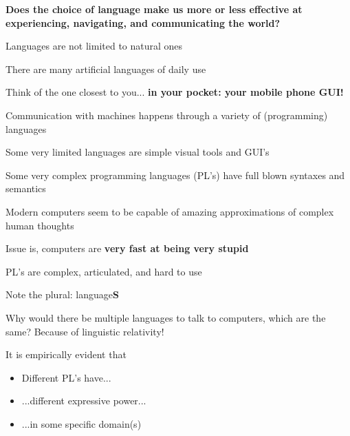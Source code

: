 \documentclass{beamer}
\begin{document}
\begin{slide}{
\item \textbf{Does the choice of language make us more or less effective at experiencing, navigating, and communicating the world?}
}\end{slide}

\begin{slide}{
\item Languages are not limited to natural ones
\item There are many artificial languages of daily use
\item Think of the one closest to you... \pause \textbf{in your pocket: your mobile phone GUI!}
}\end{slide}

\begin{slide}{
\item Communication with machines happens through a variety of (programming) languages
\item Some very limited languages are simple visual tools and GUI's
\item Some very complex programming languages (PL's) have full blown syntaxes and semantics
}\end{slide}

\begin{slide}{
\item Modern computers seem to be capable of amazing approximations of complex human thoughts
\item Issue is, computers are \textbf{very fast at being very stupid}
\item PL's are complex, articulated, and hard to use
}\end{slide}

\begin{slide}{
\item Note the plural: language\textbf{S}
\item Why would there be multiple languages to talk to computers, which are the same? \pause Because of linguistic relativity!
\item It is empirically evident that 
\begin{itemize}
\item Different PL's have...
\item ...different expressive power...
\item ...in some specific domain(s)
\end{itemize}
}\end{slide}
\end{document}
